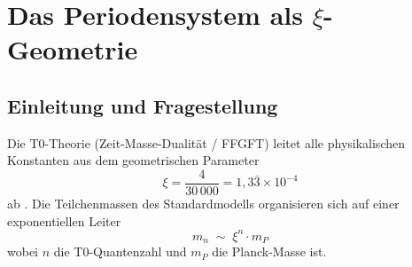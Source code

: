 
\chapter{Das Periodensystem als \texorpdfstring{$\xi$}{xi}-Geometrie}
\label{chap:periodensystem-xi}

\begin{abstract}
Das Periodensystem der Elemente und die Teilchenmassen-Leiter der T0-Theorie
teilen dieselbe geometrische Quantenzahl~$n$, jedoch in verschiedenen Rollen.
Die Teilchenmassen folgen einer \emph{radialen} exponentiellen Skalierung
$m_n \sim \xi^{n} \cdot m_P$, während die Schalenstruktur des Periodensystems
einer \emph{angularen} quadratischen Entartung $g_n = 2n^2$ gehorcht.
Beide entstehen aus der dreidimensionalen Gittergeometrie der T0-Theorie:
$\xi$ ist das Packungsdefizit des 3D-Gitters (radiale Richtung),
$2n^2$ ist der Entartungsgrad der $n$-ten Kugelschale im selben Gitter
(angulare Richtung).
Die Rydberg-Energie liegt exakt auf Stufe~7 der $\xi$-Potenzleiter:
$R_\infty = \frac{m_e \alpha^2}{2} \approx \xi^{6{,}956} \cdot E_P$.
Das Dualitätsprinzip $E_n \cdot g_n = 2R_\infty = \text{const}$
verbindet die $1/n^2$-Energieleiter mit der $n^2$-Füllleiter
und ist eine geometrische Äquipartition.
Das Periodensystem ist der angulare Querschnitt der $\xi$-Geometrie
auf Stufe $\xi^{\sim 7}$ — analog dazu sind die Leptonmassen der radiale
Querschnitt auf den Stufen $\xi^{4{,}9}$ bis $\xi^{5{,}8}$.
\end{abstract}

\section{Einleitung und Fragestellung}
\label{sec:ps-einleitung}

Die T0-Theorie (Zeit-Masse-Dualität / FFGFT) leitet alle physikalischen
Konstanten aus dem geometrischen Parameter
\begin{equation}
  \xi = \frac{4}{30\,000} = 1{,}3\overline{3} \times 10^{-4}
\end{equation}
ab \cite{dok009,dok041,dok056}.
Die Teilchenmassen des Standardmodells organisieren sich auf einer
exponentiellen Leiter
\begin{equation}
  m_n \;\sim\; \xi^{n} \cdot m_P
  \label{eq:massenleiter}
\end{equation}
wobei $n$ die T0-Quantenzahl und $m_P$ die Planck-Masse ist.

